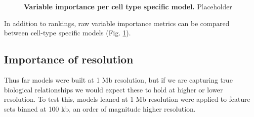\documentclass[a4paper,11pt,oneside]{book}
\begin{document}
\begin{figure}
\begin{center} 
\captionsetup{width=\textwidth} 
\caption{ {\bf Variable importance per cell type specific model. }
Placeholder
}\label{fig:varimp_diff}
\end{center} 
\end{figure} 

In addition to rankings, raw variable importance metrics can be compared between cell-type specific models (Fig. \ref{fig:varimp_diff}).


\subsection{Importance of resolution}

Thus far models were built at 1 Mb resolution, but if we are capturing true biological relationships we would expect these to hold at higher or lower resolution. To test this, models leaned at 1 Mb resolution were applied to feature sets binned at 100 kb, an order of magnitude higher resolution.
\end{document}
